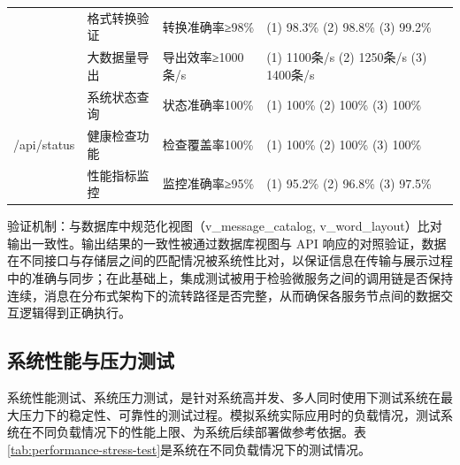 \begin{table}[H]
{\begin{tabular}{|l|l|l|l|}
\cline{2-4}
& 格式转换验证 & 转换准确率≥98\% & (1) 98.3\% (2) 98.8\% (3) 99.2\% \\
\cline{2-4}
& 大数据量导出 & 导出效率≥1000条/s & (1) 1100条/s (2) 1250条/s (3) 1400条/s \\
\hline
\multirow{3}{*}{/api/status} & 系统状态查询 & 状态准确率100\% & (1) 100\% (2) 100\% (3) 100\% \\
\cline{2-4}
& 健康检查功能 & 检查覆盖率100\% & (1) 100\% (2) 100\% (3) 100\% \\
\cline{2-4}
& 性能指标监控 & 监控准确率≥95\% & (1) 95.2\% (2) 96.8\% (3) 97.5\% \\
\hline
\end{tabular}%
}
\end{table}

验证机制：与数据库中规范化视图（v\_message\_catalog, v\_word\_layout）比对输出一致性。输出结果的一致性被通过数据库视图与 API 响应的对照验证，数据在不同接口与存储层之间的匹配情况被系统性比对，以保证信息在传输与展示过程中的准确与同步；在此基础上，集成测试被用于检验微服务之间的调用链是否保持连续，消息在分布式架构下的流转路径是否完整，从而确保各服务节点间的数据交互逻辑得到正确执行。

\subsection{系统性能与压力测试}

系统性能测试、系统压力测试，是针对系统高并发、多人同时使用下测试系统在最大压力下的稳定性、可靠性的测试过程。模拟系统实际应用时的负载情况，测试系统在不同负载情况下的性能上限、为系统后续部署做参考依据。表\ref{tab:performance-stress-test}是系统在不同负载情况下的测试情况。

